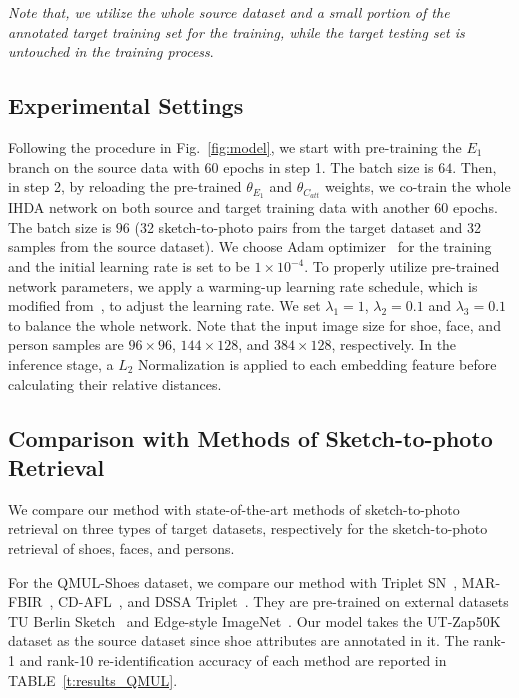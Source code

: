 \documentclass[journal]{IEEEtran}
\begin{document}
\emph{Note that, we utilize the whole source dataset and a small portion of the annotated target training set for the training, while the target testing set is untouched in the training process}.


\subsection{Experimental Settings}
Following the procedure in Fig.~\ref{fig:model}, we start with pre-training the $E_{1}$ branch on the source data with $60$ epochs in step 1. The batch size is $64$. Then, in step 2, by reloading the pre-trained $\theta_{E_{1}}$ and $\theta_{C_{att}}$ weights, we co-train the whole IHDA network on both source and target training data with another $60$ epochs. The batch size is $96$ (32 sketch-to-photo pairs from the target dataset and 32 samples from the source dataset). We choose Adam optimizer~\cite{kingma2014adam} for the training and the initial learning rate is set to be $1\times10^{-4}$. To properly utilize pre-trained network parameters, we apply a warming-up learning rate schedule, which is modified from~\cite{Luo_2019_Strong_TMM}, to adjust the learning rate. We set $\lambda_1=1$, $\lambda_2=0.1$ and $\lambda_3=0.1$ to balance the whole network. Note that the input image size for shoe, face, and person samples are $96\times96$, $144\times128$, and $384\times128$, respectively. In the inference stage, a $L_2$ Normalization is applied to each embedding feature before calculating their relative distances. 


\subsection{Comparison with Methods of Sketch-to-photo Retrieval}

We compare our method with state-of-the-art methods of sketch-to-photo retrieval on three types of target datasets, respectively for the sketch-to-photo retrieval of shoes, faces, and persons. 

For the QMUL-Shoes dataset, we compare our method with Triplet SN~\cite{yu2016sketch}, MAR-FBIR~\cite{song2016deep}, CD-AFL~\cite{pang2018cross}, and DSSA Triplet~\cite{song2017deep}. They are pre-trained on external datasets TU Berlin Sketch~\cite{eitz2012sbsr} and Edge-style ImageNet~\cite{russakovsky2015imagenet}. Our model takes the UT-Zap50K dataset as the source dataset since shoe attributes are annotated in it. The rank-1 and rank-10 re-identification accuracy of each method are reported in TABLE~\ref{t:results_QMUL}.
\end{document}
